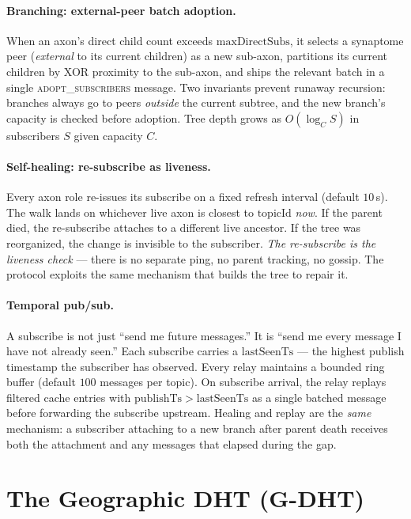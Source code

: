 \documentclass[conference]{IEEEtran}
\newcommand{\GDHT}{G-DHT\xspace}
\begin{document}
\paragraph{Branching: external-peer batch adoption.}
When an axon's direct child count exceeds $\mathrm{maxDirectSubs}$, it
selects a synaptome peer (\emph{external} to its current children) as a
new sub-axon, partitions its current children by XOR proximity to the
sub-axon, and ships the relevant batch in a single
\textsc{adopt\_subscribers} message. Two invariants prevent runaway
recursion: branches always go to peers \emph{outside} the current
subtree, and the new branch's capacity is checked before adoption. Tree
depth grows as $O(\log_{C} S)$ in subscribers $S$ given capacity $C$.

\paragraph{Self-healing: re-subscribe as liveness.}
Every axon role re-issues its subscribe on a fixed refresh interval
(default $10$\,s). The walk lands on whichever live axon is closest to
$\mathrm{topicId}$ \emph{now}. If the parent died, the re-subscribe
attaches to a different live ancestor. If the tree was reorganized,
the change is invisible to the subscriber. \emph{The re-subscribe is
the liveness check} --- there is no separate ping, no parent tracking,
no gossip. The protocol exploits the same mechanism that builds the
tree to repair it.

\paragraph{Temporal pub/sub.}
A subscribe is not just ``send me future messages.'' It is ``send me
every message I have not already seen.'' Each subscribe carries a
$\mathrm{lastSeenTs}$ --- the highest publish timestamp the subscriber
has observed. Every relay maintains a bounded ring buffer (default
$100$ messages per topic). On subscribe arrival, the relay replays
filtered cache entries with $\mathrm{publishTs} > \mathrm{lastSeenTs}$
as a single batched message before forwarding the subscribe upstream.
Healing and replay are the \emph{same} mechanism: a subscriber
attaching to a new branch after parent death receives both the
attachment and any messages that elapsed during the gap.

\section{The Geographic DHT (\GDHT)}
\label{sec:gdht}
\end{document}
